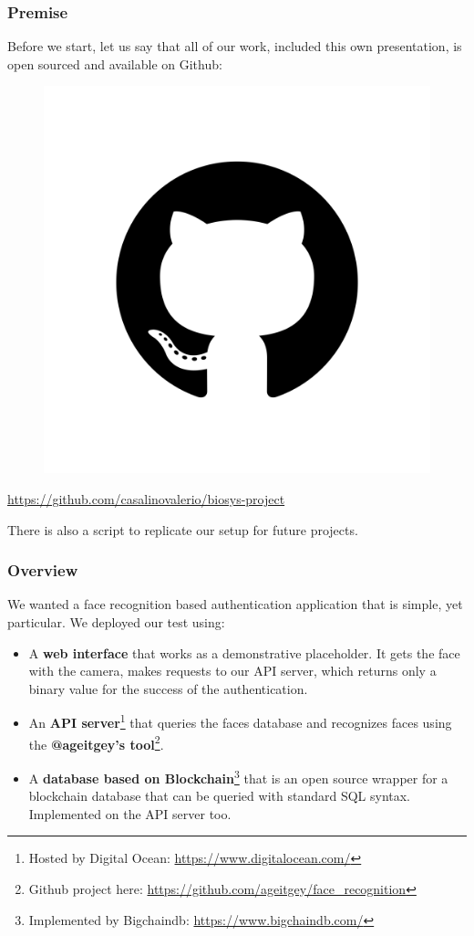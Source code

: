\begin{frame} \frametitle{Premise}

	Before we start, let us say that all of our work, included this own
	presentation, is open sourced and available on Github:
	
	\begin{center}
		\begin{figure}[H]
			\includegraphics[width=.3\textwidth]{img/github}
		\end{figure}
		{\color{red} \url{https://github.com/casalinovalerio/biosys-project}}
	\end{center}
	\vfill
	There is also a script to replicate our setup for future projects.
	
\end{frame}

\begin{frame} \frametitle{Overview}
	We wanted a face recognition based authentication application that is simple, 
	yet particular. We deployed our test using:

	\vfill
	\begin{itemize}

		\item A \textbf{web interface} that works as a 
		demonstrative placeholder. It gets the face with the camera, makes 
		requests to our API server, which returns only a binary value for the 
		success of the authentication.
	
		\item An \textbf{API server}\footnote{Hosted by Digital Ocean: 
		{\color{red} \url{https://www.digitalocean.com/}}} that queries the 
		faces database and recognizes faces using the \textbf{@ageitgey's 
		tool}\footnote{Github project here: {\color{red} 
		\url{https://github.com/ageitgey/face_recognition}}}.
	
		\item A \textbf{database based on Blockchain}\footnote{Implemented by 
		Bigchaindb: {\color{red} \url{https://www.bigchaindb.com/}}} that is an
		open source wrapper for a blockchain database that can be queried with 
		standard SQL syntax. Implemented on the API server too.
	
	\end{itemize}
	\vfill
\end{frame}

